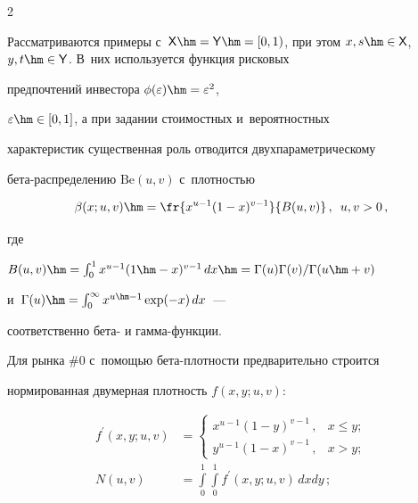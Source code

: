 \begin{multicols}{2}
  


  Рассматриваются примеры с~${\sf X}\hm= {\sf Y}\hm= [0,1)$, при этом $x, 


s\hm\in {\sf X}$, $y,t\hm\in {\sf Y}$. В~них используется функция рисковых 


предпочтений инвестора $\phi(\varepsilon)\hm=\varepsilon^2$, 


$\varepsilon\hm\in [0, 1]$, а при задании стоимостных и~вероятностных 


характеристик существенная роль отводится двухпараметрическому 


бе\-та-рас\-пре\-де\-ле\-нию $\mathrm{Be}(u, v)$ с~плотностью


  $$


  \beta(x;u,v)\hm=\fr{x^{u-1}(1-x)^{v-1}}{B(u,v)} \,,\enskip u, v>0\,,


  $$


где 


     $B(u,v)\hm= \int\nolimits_0^1 x^{u-1} (1\hm-x)^{v-1}\,dx 


     \hm= \Gamma(u)\Gamma(v)/\Gamma(u\hm+v)$


и~$\Gamma(u)\hm= \int\nolimits_0^{\infty} x^{u\hm-1} \exp(-x)\,dx$~--- 


соответственно бе\-та- и гам\-ма-функ\-ции. 





  Для рынка \#0 с~помощью бе\-та-плот\-ности предварительно строится 


нормированная двумерная плотность $f(x,y; u,v)$: 


 \begin{equation}


 \left.


 \begin{array}{rl}


  f^\prime (x,y; u,v)&=




\begin{cases} 


x^{u-1}(1-y)^{v-1}\,, & x\leq y;\\


   y^{u-1}(1-x)^{v-1}\,,& x>y;\end{cases}




  \\[12pt]


  N(u,v)&=\displaystyle\int\limits_0^1 \int\limits_0^1 f^\prime (x,y;u,v)\,dxdy\,;\\[6pt]



\end{array}
\end{equation}
\end{multicols}
